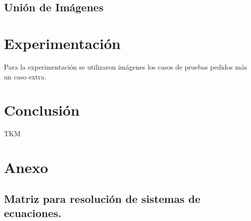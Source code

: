 \documentclass[conference]{IEEEtran}
\begin{document}
	\subsection*{Unión de Imágenes}
	


\section*{Experimentación}
	Para la experimentación se utilizaron imágenes los casos de pruebas pedidos más un caso extra.
	
	
\section*{Conclusión}
	TKM

\begin{thebibliography}{99}

\end{thebibliography}

\section*{Anexo}
	\subsection{Matriz para resolución de sistemas de ecuaciones.}
\end{document}
